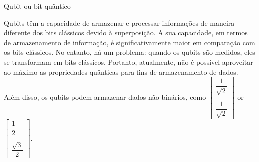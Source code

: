 \begin{frame}[allowframebreaks]{Qubit ou bit quântico}
		\par Qubits têm a capacidade de armazenar e processar informações de maneira diferente dos bits clássicos devido à superposição. A sua capacidade, em termos de armazenamento de informação, é significativamente maior em comparação com os bits clássicos. No entanto, há um problema: quando os qubits são medidos, eles se transformam em bits clássicos. Portanto, atualmente, não é possível aproveitar ao máximo as propriedades quânticas para fins de armazenamento de dados. Além disso, os qubits podem armazenar dados não binários, como	 $\begin{bmatrix} \dfrac{1}{\sqrt{2}} \\\\ \dfrac{1}{\sqrt{2}} \end{bmatrix}$ or $\begin{bmatrix} \dfrac{1}{2} \\\\ \dfrac{\sqrt{3}}{2} \end{bmatrix}$.
	\end{frame}
	
